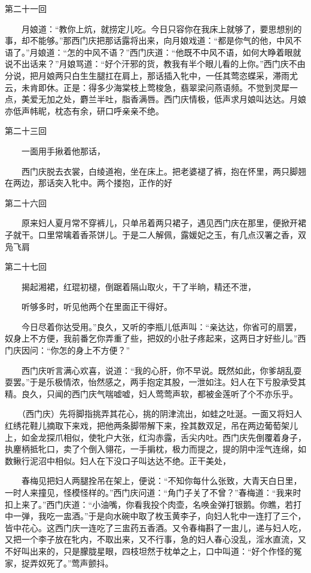 第二十一回

　　月娘道：“教你上炕，就捞定儿吃。今日只容你在我床上就够了，要思想别的事，却不能够。”那西门庆把那话露将出来，向月娘戏道：“都是你气的他，中风不语了。”月娘道：“怎的中风不语？”西门庆道：“他既不中风不语，如何大睁着眼就说不出话来？”月娘骂道：“好个汗邪的货，教我有半个眼儿看的上你。”西门庆不由分说，把月娘两只白生生腿扛在肩上，那话插入牝中，一任其莺恣蝶采，滞雨尤云，未肯即休。正是：得多少海棠枝上莺梭急，翡翠梁问燕语频。不觉到灵犀一点，美爱无加之处，麝兰半吐，脂香满唇。西门庆情极，低声求月娘叫达达。月娘亦低声帏昵，枕态有余，研口呼亲亲不绝。


第二十三回

　　一面用手揪着他那话，


　　西门庆脱去衣裳，白绫道袍，坐在床上。把老婆褪了裤，抱在怀里，两只脚翘在两边，那话突入牝中。两个搂抱，正作的好


第二十六回

　　原来妇人夏月常不穿裤儿，只单吊着两只裙子，遇见西门庆在那里，便掀开裙子就干。口里常噙着香茶饼儿。于是二人解佩，露媛妃之玉，有几点汉署之香，双凫飞肩


第二十七回

　　揭起湘裙，红琨初褪，倒踞着隔山取火，干了半晌，精还不泄，

　　听够多时，听见他两个在里面正干得好。

　　今日尽着你达受用。”良久，又听的李瓶儿低声叫：“亲达达，你省可的扇罢，奴身上不方便，我前番乞你弄重了些，把奴的小肚子疼起来，这两日才好些儿。”西门庆因问：“你怎的身上不方便？”


　　西门庆听言满心欢喜，说道：“我的心肝，你不早说。既然如此，你爹胡乱耍耍罢。”于是乐极情浓，怡然感之，两手抱定其股，一泄如注。妇人在下亏股承受其精。良久，只闻的西门庆气喘嘘嘘，妇人莺莺声软，都被金莲听了个不亦乐乎。


　　（西门庆）先将脚指挑弄其花心，挑的阴津流出，如蛙之吐涎。一面又将妇人红绣花鞋儿摘取下来戏，把他两条脚带解下来，拴其数双足，吊在两边葡萄架儿上，如金龙探爪相似，使牝户大张，红沟赤露，舌尖内吐。西门庆先倒覆着身子，执麈柄抵牝口，卖了个倒入翎花，一手掮枕，极力而提之，提的阴中淫气连绵，如数鳅行泥沼中相似。妇人在下没口子叫达达不绝。正干美处，


　　春梅见把妇人两腿拴吊在架上，便说：“不知你每什么张致，大青天白日里，一时人来撞见，怪模怪样的。”西门庆问道：“角门子关了不曾？”春梅道：“我来时扣上来了。”西门庆道：“小油嘴，你看我投个肉壶，名唤金弹打银鹅。你瞧，若打中一弹，我吃一盅酒。”于是向水碗中取了枚玉黄李子，向妇人牝中一连打了三个，皆中花心。这西门庆一连吃了三盅药五香酒。又令春梅斟了一盅儿，递与妇人吃，又把一个李子放在牝内，不取出来，又不行事，急的妇人春心没乱，淫水直流，又不好叫出来的，只是朦胧星眼，四枝坦然于枕单之上，口中叫道：“好个作怪的冤家，捉弄奴死了。”莺声颤抖。


